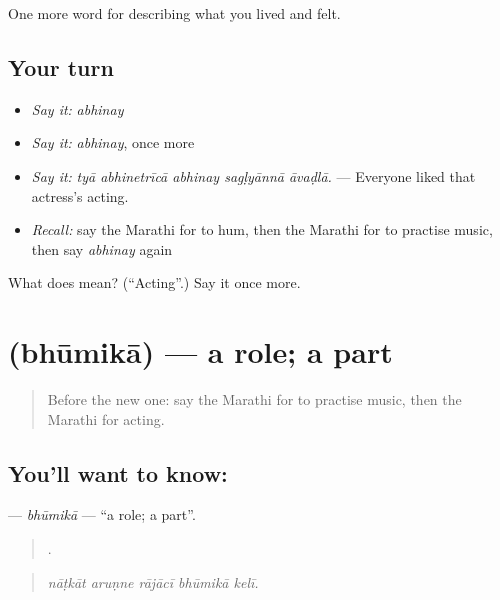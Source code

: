 \begin{grammarlens}[title={What you've built}]
One more word for describing what you lived and felt.
\end{grammarlens}

\subsection*{Your turn}
\begin{itemize}
\raggedright
  \item \emph{Say it:} \emph{abhinay}
  \item \emph{Say it:} \emph{abhinay}, once more
  \item \emph{Say it:} \emph{tyā abhinetrīcā abhinay sagḷyānnā āvaḍlā.} — Everyone liked that actress's acting.
  \item \emph{Recall:} say the Marathi for to hum, then the Marathi for to practise music, then say \emph{abhinay} again
\end{itemize}

\begin{tcolorbox}[breakable,colback=teal!4,colframe=teal!35!black,title={Before you move on}]
What does  mean? (\textquotedblleft{}Acting\textquotedblright{}.) Say it once more.
\end{tcolorbox}
\section[\texorpdfstring{\mr{भूमिका} (bhūmikā)}{भूमिका (bhūmikā)}]{ (bhūmikā) — a role; a part}

\label{lesson:MR-C537-bhumika}



\begin{quote}
Before the new one: say the Marathi for to practise music, then the Marathi for acting.
\end{quote}

\subsection*{You'll want to know: }
\textbf{} — \emph{bhūmikā} — \textquotedblleft{}a role; a part\textquotedblright{}.

\begin{quote}
    .
\end{quote}

\begin{quote}
\emph{nāṭkāt aruṇne rājācī bhūmikā kelī.}
\end{quote}

